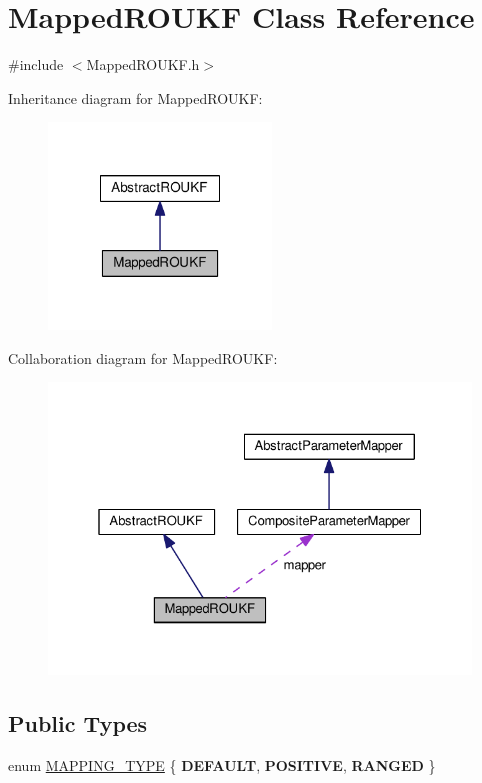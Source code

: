\hypertarget{classMappedROUKF}{}\section{Mapped\+R\+O\+U\+KF Class Reference}
\label{classMappedROUKF}


{\ttfamily \#include $<$Mapped\+R\+O\+U\+K\+F.\+h$>$}



Inheritance diagram for Mapped\+R\+O\+U\+KF\+:\nopagebreak
\begin{figure}[H]
\begin{center}
\leavevmode
\includegraphics[width=168pt]{classMappedROUKF__inherit__graph}
\end{center}
\end{figure}


Collaboration diagram for Mapped\+R\+O\+U\+KF\+:\nopagebreak
\begin{figure}[H]
\begin{center}
\leavevmode
\includegraphics[width=327pt]{classMappedROUKF__coll__graph}
\end{center}
\end{figure}
\subsection*{Public Types}
\begin{DoxyCompactItemize}
\item 
enum \mbox{\hyperlink{classMappedROUKF_a9aa29956ea12176771fbec185601deca}{M\+A\+P\+P\+I\+N\+G\+\_\+\+T\+Y\+PE}} \{ {\bfseries D\+E\+F\+A\+U\+LT}, 
{\bfseries P\+O\+S\+I\+T\+I\+VE}, 
{\bfseries R\+A\+N\+G\+ED}
 \}
\end{DoxyCompactItemize}
